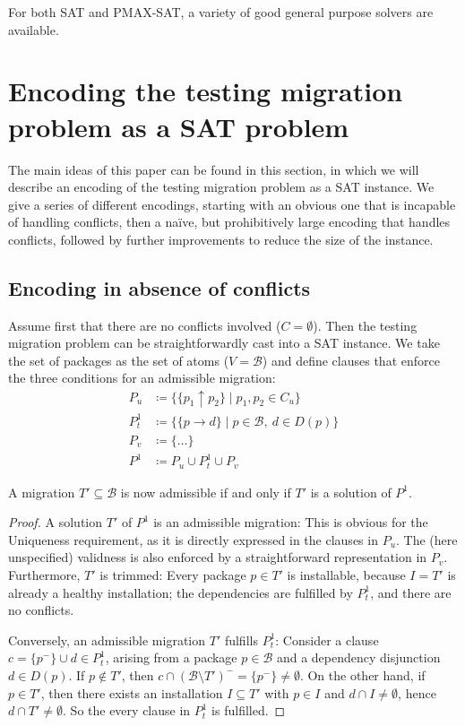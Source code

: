 \documentclass[halfparskip,11pt]{scrartcl}
\begin{document}
For both SAT and PMAX-SAT, a variety of good general purpose solvers are available.

\section{Encoding the testing migration problem as a SAT problem}

The main ideas of this paper can be found in this section, in which we will describe an encoding of the testing migration problem as a SAT instance. We give a series of different encodings, starting with an obvious one that is incapable of handling conflicts, then a naïve, but prohibitively large encoding that handles conflicts, followed by further improvements to reduce the size of the instance.

\subsection{Encoding in absence of conflicts}

Assume first that there are no conflicts involved ($C = \emptyset$). Then the testing migration problem can be straightforwardly cast into a SAT instance. We take the set of packages as the set of atoms ($V=\mathcal B$) and define clauses that enforce the three conditions for an admissible migration:
\begin{align*}
P_u &\coloneqq \{ \{p_1 \uparrow p_2\} \mid p_1,p_2 \in C_u\} \\
P_t^1 &\coloneqq \{ \{ p \to d \} \mid p\in \mathcal B,\ d \in D(p)\}\\
P_v &\coloneqq \{ \ldots \} \\
P^1 &\coloneqq P_u \cup P^1_t \cup P_v
\end{align*}

A migration $T'\subseteq \mathcal B$ is now admissible if and only if $T'$ is a solution of $P^1$.

\begin{proof}
A solution $T'$ of $P^1$ is an admissible migration: This is obvious for the Uniqueness requirement, as it is directly expressed in the clauses in $P_u$. The (here unspecified) validness is also enforced by a straightforward representation in $P_v$.
Furthermore, $T'$ is trimmed: Every package $p\in T'$ is installable, because $I=T'$ is already a healthy installation; the dependencies are fulfilled by $P^1_t$, and there are no conflicts.

Conversely, an admissible migration $T'$ fulfills $P^1_t$: Consider a clause $c=\{p^-\}\cup d\in P^1_t$, arising from a package $p\in \mathcal B$ and a dependency disjunction $d\in D(p)$. If $p\notin T'$, then $c\cap (\mathcal B\setminus T')^- = \{p^-\} \ne \emptyset$. On the other hand, if $p\in T'$, then there exists an installation $I\subseteq T'$ with $p\in I$ and $d\cap I \ne \emptyset$, hence $d\cap T'\ne\emptyset$. So the every clause in $P^1_t$ is fulfilled.
\end{proof}
\end{document}
